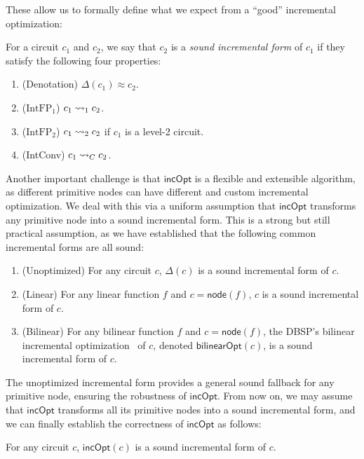 These allow us to formally define what we expect from a ``good'' incremental optimization:
\begin{definition}
    For a circuit $c_1$ and $c_2$, we say that $c_2$ is a \emph{sound incremental form} of $c_1$ if they satisfy the following four properties:
    \begin{enumerate}
        \item (Denotation) $\Delta(c_1) \approx c_2$.
        \item ($\text{IntFP}_1$) $c_1 \rightsquigarrow_1 c_2$.
        \item ($\text{IntFP}_2$) $c_1 \rightsquigarrow_2 c_2$ if $c_1$ is a level-2 circuit.
        \item (IntConv) $c_1 \rightsquigarrow_{C} c_2$.
    \end{enumerate}
\end{definition}

Another important challenge is that $\mathsf{incOpt}$ is a flexible and extensible algorithm, as different primitive nodes can have different and custom incremental optimization. We deal with this via a uniform assumption that $\mathsf{incOpt}$ transforms any primitive node into a sound incremental form. This is a strong but still practical assumption, as we have established that the following common incremental forms are all sound:
\begin{proposition}\label{thm:common-sound-incremental-forms}
    \;
    \begin{enumerate}
        \item (Unoptimized) For any circuit $c$, $\Delta(c)$ is a sound incremental form of $c$.
        \item (Linear) For any linear function $f$ and $c = \mathsf{node}(f)$, $c$ is a sound incremental form of $c$.
        \item (Bilinear) For any bilinear function $f$ and $c = \mathsf{node}(f)$, the DBSP's bilinear incremental optimization~\cite{budiu2025dbsp} of $c$, denoted $\mathsf{bilinearOpt}(c)$, is a sound incremental form of $c$.
    \end{enumerate}
\end{proposition} 
The unoptimized incremental form provides a general sound fallback for any primitive node, ensuring the robustness of $\mathsf{incOpt}$. From now on, we may assume that $\mathsf{incOpt}$ transforms all its primitive nodes into a sound incremental form, and we can finally establish the correctness of $\mathsf{incOpt}$ as follows:
\begin{theorem}\label{thm:incOpt-correctness}
    For any circuit $c$, $\mathsf{incOpt}(c)$ is a sound incremental form of $c$.
\end{theorem}

